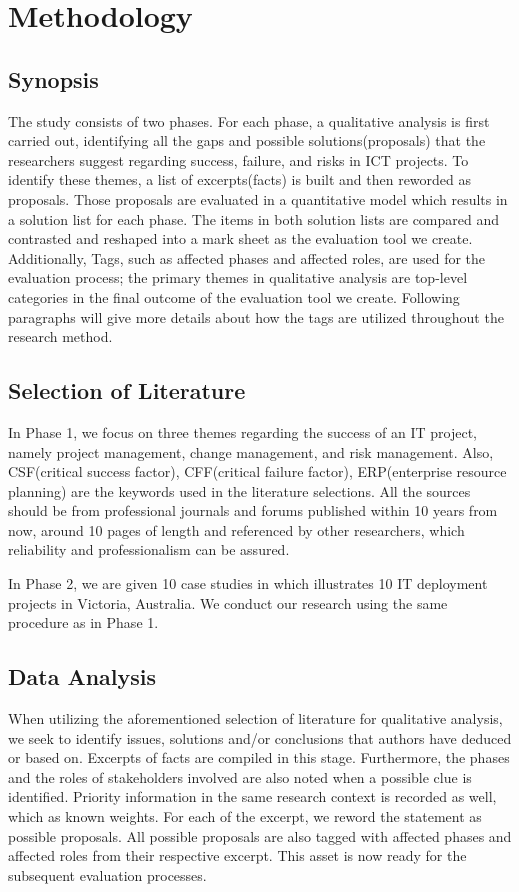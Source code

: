 
\section{Methodology}
\subsection{Synopsis}
The study consists of two phases. For each phase, a qualitative analysis is first carried out, identifying all the gaps and possible solutions(proposals) that the researchers suggest regarding success, failure, and risks in ICT projects. To identify these themes, a list of excerpts(facts) is built and then reworded as proposals. Those proposals are evaluated in a quantitative model which results in a solution list for each phase. The items in both solution lists are compared and contrasted and reshaped into a mark sheet as the evaluation tool we create. Additionally, Tags, such as affected phases and affected roles, are used for the evaluation process; the primary themes in qualitative analysis are top-level categories in the final outcome of the evaluation tool we create. Following paragraphs will give more details about how the tags are utilized throughout the research method.


\subsection{Selection of Literature}
In Phase 1, we focus on three themes regarding the success of an IT project, namely project management, change management, and risk management. Also, CSF(critical success factor), CFF(critical failure factor), ERP(enterprise resource planning) are the keywords used in the literature selections. All the sources should be from professional journals and forums published within 10 years from now, around 10 pages of length and referenced by other researchers, which reliability and professionalism can be assured.

In Phase 2, we are given 10 case studies in  which illustrates 10 IT deployment projects in Victoria, Australia. We conduct our research using the same procedure as in Phase 1.

\subsection{Data Analysis}
When utilizing the aforementioned selection of literature for qualitative analysis, we seek to identify issues, solutions and/or conclusions that authors have deduced or based on. Excerpts of facts are compiled in this stage. Furthermore, the phases and the roles of stakeholders involved are also noted when a possible clue is identified. Priority information in the same research context is recorded as well, which as known weights. For each of the excerpt, we reword the statement as possible proposals. All possible proposals are also tagged with affected phases and affected roles from their respective excerpt. This asset is now ready for the subsequent evaluation processes.

